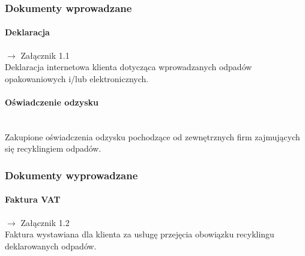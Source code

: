 
\subsubsection{Dokumenty wprowadzane}
	\paragraph{Deklaracja} $\rightarrow$ Załącznik 1.1 \\
	Deklaracja internetowa klienta dotycząca wprowadzanych odpadów opakowaniowych i/lub elektronicznych.

	\paragraph{Oświadczenie odzysku} \ \\
	Zakupione oświadczenia odzysku pochodzące od zewnętrznych firm zajmujących się recyklingiem odpadów.

\subsubsection{Dokumenty wyprowadzane}
	\paragraph{Faktura VAT} $\rightarrow$ Załącznik 1.2 \\
	Faktura wystawiana dla klienta za usługę przejęcia obowiązku recyklingu deklarowanych odpadów. 

